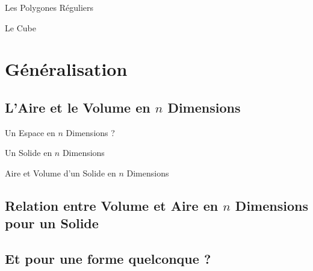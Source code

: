 \documentclass{beamercours}
\begin{document}
            \begin{frame}{Les Polygones Réguliers}
                
            \end{frame}

            \begin{frame}{Le Cube}
                
            \end{frame}

    \section{Généralisation}
        \subsection{L'Aire et le Volume en $n$ Dimensions}
            \begin{frame}{Un Espace en $n$ Dimensions ?}
                
            \end{frame}

            \begin{frame}{Un Solide en $n$ Dimensions}
                
            \end{frame}

            \begin{frame}{Aire et Volume d'un Solide en $n$ Dimensions}
                
            \end{frame}
        \subsection{Relation entre Volume et Aire en $n$ Dimensions pour un Solide}

        \subsection{Et pour une forme quelconque ?}
\end{document}
